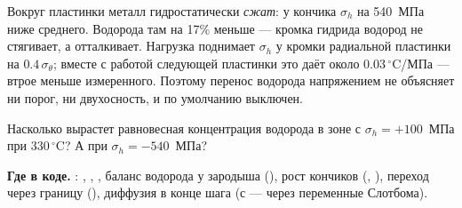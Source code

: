\begin{warnbox}
Вокруг пластинки металл гидростатически \emph{сжат}: у кончика $\sigma_h$ на 540~МПа ниже
среднего. Водорода там на 17\% меньше --- кромка гидрида водород не стягивает, а отталкивает.
Нагрузка поднимает $\sigma_h$ у кромки радиальной пластинки на $0.4\,\sigma_\theta$; вместе с работой
следующей пластинки это даёт около $0.03\,^\circ$C/МПа --- втрое меньше измеренного. Поэтому
перенос водорода напряжением не объясняет ни порог, ни двухосность, и по умолчанию выключен.
\end{warnbox}

\begin{exercise}
Насколько вырастет равновесная концентрация водорода в зоне с $\sigma_h=+100$~МПа при 330\,$^\circ$C?
А при $\sigma_h=-540$~МПа?
\end{exercise}

\begin{codebox}
\textbf{Где в коде.} : , , , баланс водорода у
зародыша (), рост кончиков  (, ), переход через
границу  (), диффузия в конце шага (с  --- через
переменные Слотбома).
\end{codebox}
